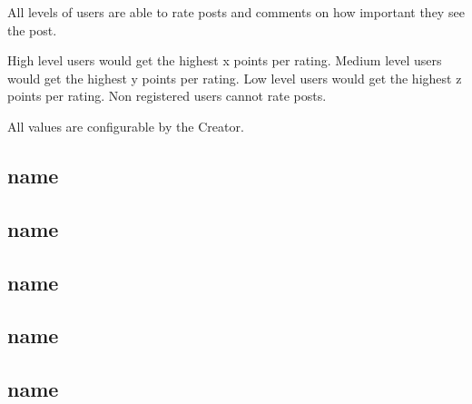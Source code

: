 \documentclass[11pt]{article}
\begin{document}
All levels of users are able to rate posts and comments on how important they see the post.

High level users would get the highest x points per rating.
Medium level users would get the highest y points per rating.
Low level users would get the highest z points per rating.
Non registered users cannot rate posts.

All values are configurable by the Creator.



\subsection{name}
\subsection{name}
\subsection{name}
\subsection{name}
\subsection{name}
\end{document}

